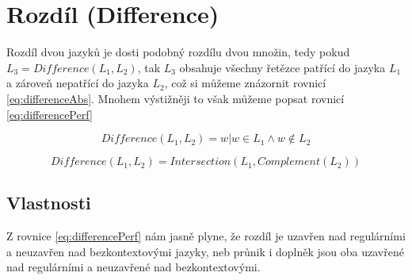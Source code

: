 \section{Rozdíl (Difference)} \label{sec:diff}
Rozdíl dvou jazyků je dosti podobný rozdílu dvou množin, tedy pokud $L_{3}=Difference(L_{1},L_{2})$, tak $L_{3}$ obsahuje všechny řetězce patřící do jazyka $L_{1}$ a zároveň nepatřící do jazyka $L_{2}$, což si můžeme znázornit rovnicí \ref{eq:differenceAbs}. Mnohem výstižněji to však můžeme popsat rovnicí \ref{eq:differencePerf}


\begin{equation}
\label{eq:differenceAbs}
	Difference(L_{1}, L_{2})= {w|w\in L_{1} \land w \notin L_{2}}
\end{equation}

\begin{equation}
\label{eq:differencePerf}
Difference(L_{1}, L_{2})= Intersection(L_{1},Complement(L_{2}))
\end{equation}

\subsection{Vlastnosti}
Z rovnice \ref{eq:differencePerf} nám jasně plyne, že rozdíl je uzavřen nad regulárními a neuzavřen nad bezkontextovými jazyky, neb průnik i doplněk jsou oba uzavřené nad regulárními a neuzavřené nad bezkontextovými.